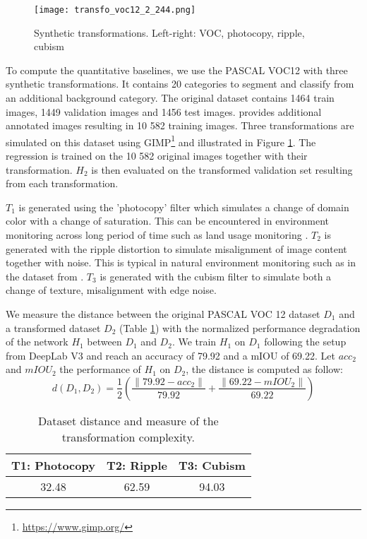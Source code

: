 \documentclass{bmvc2k}
\begin{document}
\begin{figure}[thb]
  \centering
  \texttt{[image: transfo\_voc12\_2\_244.png]}
  \caption{Synthetic transformations. Left-right: VOC, photocopy, ripple, cubism}
  \label{fig:transfoVOC12}
\end{figure}

To compute the quantitative baselines, we use the PASCAL VOC12 
\cite{everingham2015pascal} with three synthetic transformations.  
It contains
20 categories to segment and classify from an additional background category. 
The original dataset contains 1464 train images, 
1449 validation images and 1456 test images. \cite{hariharan2011semantic} provides additional
annotated images resulting in 10 582 training images. 
Three transformations are simulated on this dataset using
GIMP\footnote{\url{https://www.gimp.org/}} and illustrated
in Figure \ref{fig:transfoVOC12}. The regression is trained on the 10 582 original
images together with their transformation. $H_2$ is then evaluated on the transformed validation 
set resulting from each transformation.

$T_1$ is generated using the 'photocopy' filter 
which simulates a change of domain color with a change of saturation. This can
be encountered in environment monitoring across long period of time such as
land usage monitoring \cite{richard2018}.
$T_2$ is generated with the ripple distortion to simulate misalignment of image 
content together with noise. This is typical in natural environment monitoring such 
as in the dataset from \cite{griffith2017symphony}. 
$T_3$ is generated with the cubism filter to simulate both a change of texture, 
misalignment with edge noise. 

We measure the distance between the original 
PASCAL VOC 12 dataset $D_1$ and a transformed dataset $D_2$ (Table \ref{tab:dd}) 
with the normalized performance degradation of the network 
$H_1$ between $D_1$ and $D_2$. We train $H_1$ on $D_1$ following the setup from 
DeepLab V3 \cite{chen2018deeplab} and reach an accuracy of 79.92 and a mIOU of 
69.22. Let $acc_2$ and $mIOU_2$ the performance of $H_1$ on $D_2$, the distance 
is computed as follow: 
\begin{equation}
  d(D_1, D_2) = \frac{1}{2}( \frac{\|79.92 - acc_2\|}{79.92} + 
  \frac{\|69.22 - mIOU_2\|}{69.22})
\end{equation}

\begin{table}
\begin{center}
\begin{tabular}{|c|c|c|}
\hline
T1: Photocopy & T2: Ripple & T3: Cubism\\
\hline     
32.48  & 62.59  & 94.03\\
\hline
\end{tabular}
\end{center}
\caption{Dataset distance and measure of the transformation
    complexity.}
\label{tab:dd}
\end{table}
\end{document}
